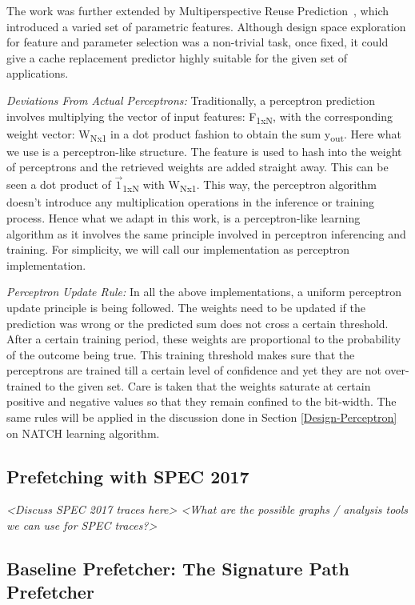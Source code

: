 The work was further extended by Multiperspective Reuse
Prediction~\cite{Multiperspective}, which introduced a varied set of
parametric features.  Although design space exploration for feature
and parameter selection was a non-trivial task, once fixed, it could
give a cache replacement predictor highly suitable for the given set
of applications.

\textit{Deviations From Actual Perceptrons:} Traditionally, a
perceptron prediction involves multiplying the vector of input
features: F\textsubscript{1xN}, with the corresponding weight vector:
W\textsubscript{Nx1} in a dot product fashion to obtain the sum
y\textsubscript{out}.  Here what we use is a perceptron-like
structure.  The feature is used to hash into the weight of perceptrons
and the retrieved weights are added straight away.  This can be seen a
dot product of $\vec{1}$\textsubscript{1xN} with W\textsubscript{Nx1}.
This way, the perceptron algorithm doesn't introduce any
multiplication operations in the inference or training process.  Hence
what we adapt in this work, is a perceptron-like learning algorithm as
it involves the same principle involved in perceptron inferencing and
training.  For simplicity, we will call our implementation as
perceptron implementation.

\textit{Perceptron Update Rule:} In all the above implementations, a
uniform perceptron update principle is being followed.  The weights
need to be updated if the prediction was wrong or the predicted sum
does not cross a certain threshold.  After a certain training period,
these weights are proportional to the probability of the outcome being
true.  This training threshold makes sure that the perceptrons are
trained till a certain level of confidence and yet they are not
over-trained to the given set.  Care is taken that the weights
saturate at certain positive and negative values so that they remain
confined to the bit-width.  The same rules will be applied in the
discussion done in Section \ref{Design-Perceptron} on NATCH learning algorithm.

 
\subsection{Prefetching with SPEC 2017}
\label{Background-SPEC2017}
\textit{<Discuss SPEC 2017 traces here>
<What are the possible graphs / analysis tools we can use for SPEC traces?>}

\subsection{Baseline Prefetcher: The Signature Path Prefetcher}
\label{Background-SPP}


